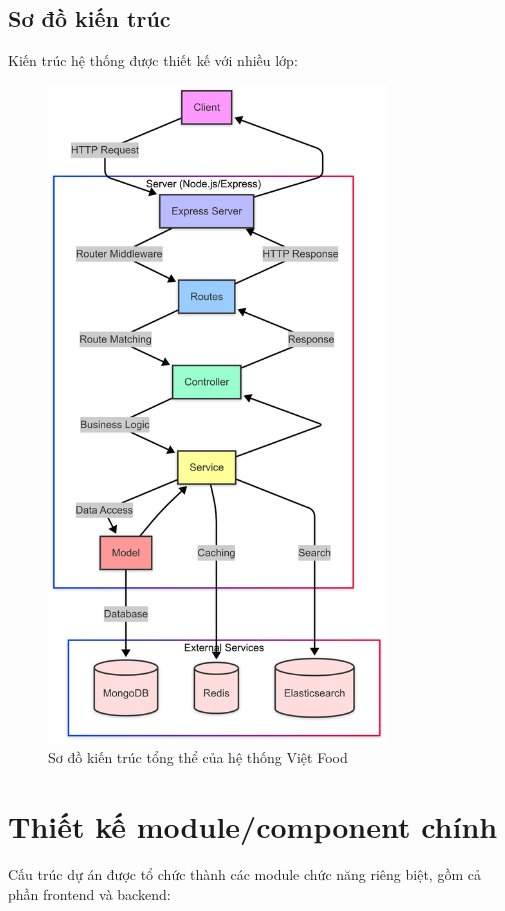 \subsection{Sơ đồ kiến trúc}
Kiến trúc hệ thống được thiết kế với nhiều lớp:
\begin{figure}[H]
\centering  
\includegraphics[width=0.8\textwidth]{images/architecture.png}
\caption{Sơ đồ kiến trúc tổng thể của hệ thống Việt Food}
\end{figure}


\section{Thiết kế module/component chính}
Cấu trúc dự án được tổ chức thành các module chức năng riêng biệt, gồm cả phần frontend và backend:

